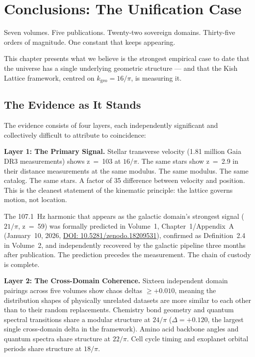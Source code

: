 \documentclass[11pt, letterpaper, openany]{book}
\begin{document}
\chapter{Conclusions: The Unification Case}

Seven volumes. Five publications. Twenty-two sovereign domains. Thirty-five orders of
magnitude. One constant that keeps appearing.

This chapter presents what we believe is the strongest empirical case to date that the
universe has a single underlying geometric structure --- and that the Kish Lattice
framework, centred on $k_\text{geo} = 16/\pi$, is measuring it.

\section*{The Evidence as It Stands}

The evidence consists of four layers, each independently significant and collectively
difficult to attribute to coincidence:

\textbf{Layer 1: The Primary Signal.}
Stellar transverse velocity (1.81 million Gaia DR3 measurements) shows z~=~103 at
$16/\pi$. The same stars show z~=~2.9 in their distance measurements at the same
modulus. The same modulus. The same catalog. The same stars. A factor of 35 difference
between velocity and position. This is the cleanest statement of the kinematic
principle: the lattice governs motion, not location.

The 107.1~Hz harmonic that appears as the galactic domain's strongest signal
($21/\pi$, z~=~59) was formally predicted in Volume~1, Chapter~1/Appendix~A
(January~10, 2026, \href{https://doi.org/10.5281/zenodo.18209531}{DOI: 10.5281/zenodo.18209531}),
confirmed as Definition~2.4 in Volume~2, and independently recovered by the
galactic pipeline three months after publication. The prediction precedes the
measurement. The chain of custody is complete.

\textbf{Layer 2: The Cross-Domain Coherence.}
Sixteen independent domain pairings across five volumes show chaos deltas $\geq +0.010$,
meaning the distribution shapes of physically unrelated datasets are more similar to
each other than to their random replacements. Chemistry bond geometry and quantum
spectral transitions share a modular structure at $24/\pi$ ($\Delta = +0.120$, the
largest single cross-domain delta in the framework). Amino acid backbone angles and
quantum spectra share structure at $22/\pi$. Cell cycle timing and exoplanet orbital
periods share structure at $18/\pi$.
\end{document}
